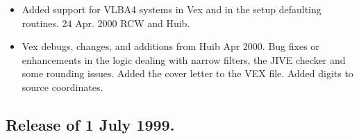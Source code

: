 \documentclass{report}
\begin{document}
\begin{itemize}
\item Added support for VLBA4 systems in Vex and in the setup defaulting
      routines.  24 Apr. 2000  RCW and Huib.

\item Vex debugs, changes, and additions from Huib Apr 2000.  Bug fixes
      or enhancements in the logic dealing with narrow filters, the JIVE
      checker and some rounding issues.  Added the cover letter to the
      VEX file.  Added digits to source coordinates.

\end{itemize}

\subsection{\label{SSSEC:1JUL99}Release of 1 July 1999.}
\end{document}
